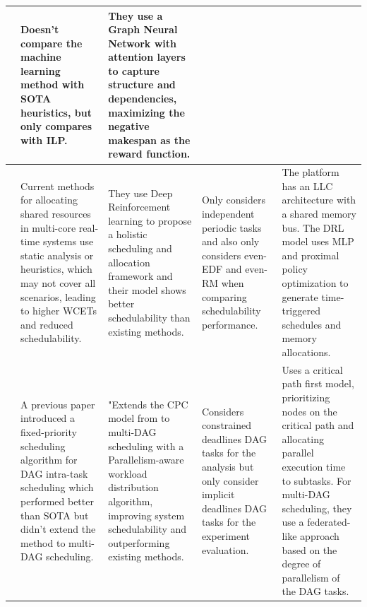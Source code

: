 \begin{table}
\begin{tabular}[]{|p{0.15in}|p{1.6in}|p{1.6in}|p{1.6in}|p{1.6in}|}
         & Doesn't compare the  machine learning 
        method with SOTA heuristics, but only compares with ILP. & They use a Graph Neural Network with attention layers to capture structure and dependencies, 
        maximizing the negative makespan as the reward function.\\
        \hline
        \cite{Xu2023DRLtaskSched} & Current methods for allocating shared resources in multi-core real-time
         systems use static analysis or heuristics, which may not cover all scenarios, leading to higher WCETs and reduced schedulability. & 
        They use Deep Reinforcement learning to propose a holistic scheduling and allocation
        framework and their model shows better schedulability than 
        existing methods. & Only considers independent periodic tasks
        and also only considers even-EDF and even-RM when comparing schedulability performance. &
        The platform has an LLC architecture with a shared memory bus. The DRL model uses MLP and proximal 
        policy optimization to generate time-triggered schedules and memory allocations.\\
        \hline
        \cite{Zhao2022DAGsched} & A previous paper \cite{zhao2020DAGsched} introduced a fixed-priority scheduling 
        algorithm for DAG intra-task scheduling which performed better 
        than SOTA but didn't extend the method to multi-DAG scheduling. & 
        "Extends the CPC model from \cite{zhao2020DAGsched} to multi-DAG scheduling with a Parallelism-aware workload distribution algorithm, improving system schedulability and outperforming existing methods. & 
        Considers constrained deadlines DAG tasks for the analysis
        but only consider implicit deadlines DAG tasks for the experiment evaluation. & Uses a critical path first model, prioritizing nodes on the critical 
        path and allocating parallel execution time to subtasks. For multi-DAG scheduling, they use a federated-like approach based on the degree of parallelism of the DAG tasks.  \\
        \hline
    \end{tabular}
\end{table}
